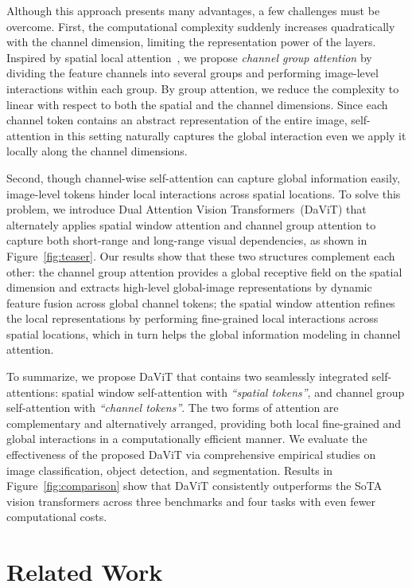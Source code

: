 \documentclass[runningheads]{llncs}
\newcommand{\model}{DaViT\xspace}
\newcommand{\modelFull}{Dual Attention Vision Transformers\xspace}
\begin{document}
Although this approach presents many advantages, a few challenges must be overcome. 
First, the computational complexity suddenly increases quadratically with the channel dimension, limiting the representation power of the layers. Inspired by spatial local attention~\cite{liu2021swin,zhang2021multi,vaswani2021scaling}, we propose {\em channel group attention} by dividing the feature channels into several groups and performing image-level interactions within each group. By group attention, we reduce the complexity to linear with respect to both the spatial and the channel dimensions. 
Since each channel token contains an abstract representation of the entire image, self-attention in this setting naturally captures the global interaction even we apply it locally along the channel dimensions.

Second, though channel-wise self-attention can capture global information easily, image-level tokens hinder local interactions across spatial locations.
To solve this problem, we introduce \modelFull~(\model) that alternately applies spatial window attention and channel group attention to capture both short-range and long-range visual dependencies, as shown in Figure~\ref{fig:teaser}.
Our results show that these two structures complement each other: the channel group attention provides a global receptive field on the spatial dimension and extracts high-level global-image representations by dynamic feature fusion across global channel tokens; the spatial window attention refines the local representations by performing fine-grained local interactions across spatial locations, which in turn helps the global information modeling in channel attention.

To summarize, we propose \model that contains two seamlessly integrated self-attentions: spatial window self-attention with {\em ``spatial tokens''}, and channel group self-attention with {\em ``channel tokens''}. The two forms of attention are complementary and alternatively arranged, providing both local fine-grained and global interactions in a computationally efficient manner.
We evaluate the effectiveness of the proposed \model via comprehensive empirical studies on image classification, object detection, and segmentation. Results in Figure~\ref{fig:comparison} show that \model consistently outperforms the SoTA vision transformers across three benchmarks and four tasks with even fewer computational costs.
 \section{Related Work}
\end{document}
